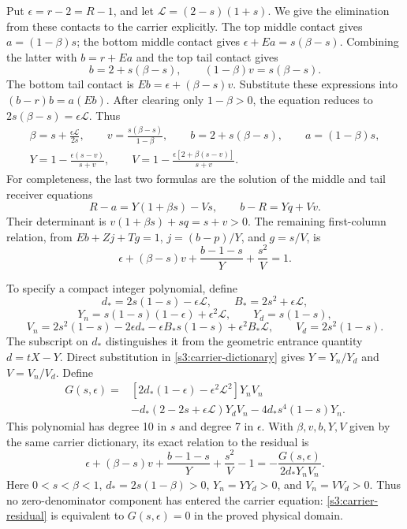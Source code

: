 \documentclass[11pt,reqno]{amsart}
\theoremstyle{definition}
\theoremstyle{remark}
\begin{document}
Put \(\epsilon=r-2=R-1\), and let
\(\mathcal L=(2-s)(1+s)\). We give the elimination from these
contacts to the carrier explicitly. The top middle contact gives
\(a=(1-\beta)s\); the bottom middle contact gives
\(\epsilon+Ea=s(\beta-s)\). Combining the latter with
\(b=r+Ea\) and the top tail contact gives
\[
 b=2+s(\beta-s),\qquad (1-\beta)v=s(\beta-s).
\]
The bottom tail contact is \(Eb=\epsilon+(\beta-s)v\).
Substitute these expressions into \((b-r)b=a(Eb)\).
After clearing only \(1-\beta>0\), the equation reduces to
\(2s(\beta-s)=\epsilon\mathcal L\). Thus
\begin{equation}\label{s3:carrier-dictionary}
\begin{gathered}
 \beta=s+\frac{\epsilon\mathcal L}{2s},\qquad
 v=\frac{s(\beta-s)}{1-\beta},\qquad
 b=2+s(\beta-s),\qquad a=(1-\beta)s,\\
 Y=1-\frac{\epsilon(s-v)}{s+v},\qquad
 V=1-\frac{\epsilon[2+\beta(s-v)]}{s+v}.
\end{gathered}
\end{equation}
For completeness, the last two formulas are the solution of the
middle and tail receiver equations
\[
 R-a=Y(1+\beta s)-Vs,\qquad b-R=Yq+Vv.
\]
Their determinant is \(v(1+\beta s)+sq=s+v>0\).
The remaining first-column relation, from
\(Eb+Zj+Tg=1\), \(j=(b-p)/Y\), and \(g=s/V\), is
\begin{equation}\label{s3:carrier-residual}
 \epsilon+(\beta-s)v+\frac{b-1-s}{Y}+\frac{s^2}{V}=1.
\end{equation}

To specify a compact integer polynomial, define
\[
 d_*=2s(1-s)-\epsilon\mathcal L,\qquad
 B_*=2s^2+\epsilon\mathcal L,
\]
\[
 Y_n=s(1-s)(1-\epsilon)+\epsilon^2\mathcal L,
 \qquad Y_d=s(1-s),
\]
\[
 V_n=2s^2(1-s)-2\epsilon d_*
       -\epsilon B_*s(1-s)+\epsilon^2B_*\mathcal L,
 \qquad V_d=2s^2(1-s).
\]
The subscript on \(d_*\) distinguishes it from the geometric
entrance quantity \(d=tX-Y\). Direct substitution in
\eqref{s3:carrier-dictionary} gives \(Y=Y_n/Y_d\) and
\(V=V_n/V_d\). Define
\begin{equation}\label{s3:carrier-poly}
\begin{split}
 G(s,\epsilon)={}&[2d_*(1-\epsilon)-\epsilon^2\mathcal L^2]Y_nV_n\\
 &-d_*(2-2s+\epsilon\mathcal L)Y_dV_n
       -4d_*s^4(1-s)Y_n.
\end{split}
\end{equation}
This polynomial has degree 10 in \(s\) and degree 7 in
\(\epsilon\). With \(\beta,v,b,Y,V\) given by the same
carrier dictionary, its exact relation to the residual is
\begin{equation}\label{s3:carrier-clearing}
 \epsilon+(\beta-s)v+\frac{b-1-s}{Y}+\frac{s^2}{V}-1
       =-\frac{G(s,\epsilon)}{2d_*Y_nV_n}.
\end{equation}
Here \(0<s<\beta<1\),
\(d_*=2s(1-\beta)>0\), \(Y_n=YY_d>0\), and
\(V_n=VV_d>0\). Thus no zero-denominator component has entered
the carrier equation: \eqref{s3:carrier-residual} is equivalent
to \(G(s,\epsilon)=0\) in the proved physical domain.
\end{document}
